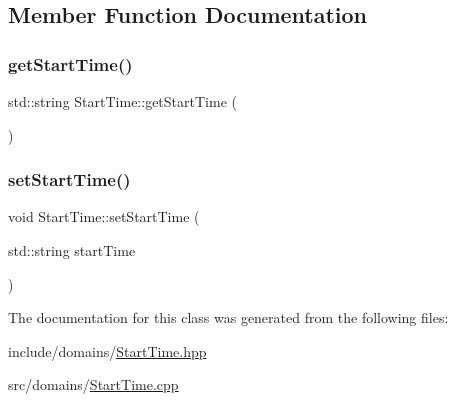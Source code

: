 \subsection{Member Function Documentation}
\mbox{\label{class_start_time_a0a58ef81a90d0f58a7957e49dfa88684}} 
\subsubsection{\texorpdfstring{getStartTime()}{getStartTime()}}
{\footnotesize\ttfamily std\+::string Start\+Time\+::get\+Start\+Time (\begin{DoxyParamCaption}{ }\end{DoxyParamCaption})}

\mbox{\label{class_start_time_ad6692d66a7c97d3a58f6d7b5b56880bc}} 
\subsubsection{\texorpdfstring{setStartTime()}{setStartTime()}}
{\footnotesize\ttfamily void Start\+Time\+::set\+Start\+Time (\begin{DoxyParamCaption}\item[{std\+::string}]{start\+Time }\end{DoxyParamCaption})}



The documentation for this class was generated from the following files\+:\begin{DoxyCompactItemize}
\item 
include/domains/\mbox{\hyperlink{_start_time_8hpp}{Start\+Time.\+hpp}}\item 
src/domains/\mbox{\hyperlink{_start_time_8cpp}{Start\+Time.\+cpp}}\end{DoxyCompactItemize}
